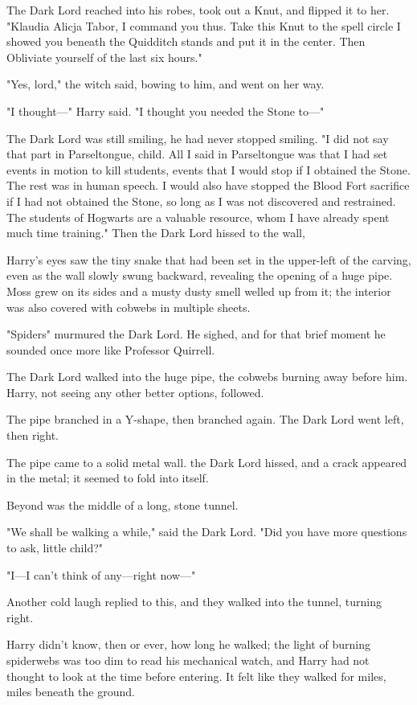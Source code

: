 The Dark Lord reached into his robes, took out a Knut, and flipped it to her.
"Klaudia Alicja Tabor, I command you thus. Take this Knut to the spell circle I
showed you beneath the Quidditch stands and put it in the center. Then
Obliviate yourself of the last six hours."

"Yes, lord," the witch said, bowing to him, and went on her way.

"I thought\mbox{---}" Harry said. "I thought you needed the Stone to\mbox{---}"

The Dark Lord was still smiling, he had never stopped smiling. "I did not say
that part in Parseltongue, child. All I said in Parseltongue was that I had set
events in motion to kill students, events that I would stop if I obtained the
Stone. The rest was in human speech. I would also have stopped the Blood Fort
sacrifice if I had not obtained the Stone, so long as I was not discovered and
restrained. The students of Hogwarts are a valuable resource, whom I have
already spent much time training." Then the Dark Lord hissed to the wall,

Harry's eyes saw the tiny snake that had been set in the upper-left of the
carving, even as the wall slowly swung backward, revealing the opening of a
huge pipe. Moss grew on its sides and a musty dusty smell welled up from it;
the interior was also covered with cobwebs in multiple sheets.

"Spiders{\el}" murmured the Dark Lord. He sighed, and for that brief moment
he sounded once more like Professor Quirrell.

The Dark Lord walked into the huge pipe, the cobwebs burning away before him.
Harry, not seeing any other better options, followed.

The pipe branched in a Y-shape, then branched again. The Dark Lord went left,
then right.

The pipe came to a solid metal wall.  the Dark Lord hissed, and a
crack appeared in the metal; it seemed to fold into itself.

Beyond was the middle of a long, stone tunnel.

"We shall be walking a while," said the Dark Lord. "Did you have more questions
to ask, little child?"

"I---I can't think of any---right now\mbox{---}"

Another cold laugh replied to this, and they walked into the tunnel, turning
right.

Harry didn't know, then or ever, how long he walked; the light of burning
spiderwebs was too dim to read his mechanical watch, and Harry had not thought
to look at the time before entering. It felt like they walked for miles, miles
beneath the ground.

